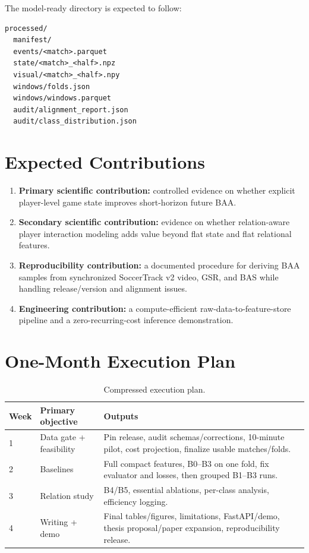 \documentclass[11pt,a4paper]{article}
\begin{document}
The model-ready directory is expected to follow:
\begin{verbatim}
processed/
  manifest/
  events/<match>.parquet
  state/<match>_<half>.npz
  visual/<match>_<half>.npy
  windows/folds.json
  windows/windows.parquet
  audit/alignment_report.json
  audit/class_distribution.json
\end{verbatim}

\section{Expected Contributions}
\begin{enumerate}
  \item \textbf{Primary scientific contribution:} controlled evidence on whether explicit player-level game state improves short-horizon future BAA.
  \item \textbf{Secondary scientific contribution:} evidence on whether relation-aware player interaction modeling adds value beyond flat state and flat relational features.
  \item \textbf{Reproducibility contribution:} a documented procedure for deriving BAA samples from synchronized SoccerTrack v2 video, GSR, and BAS while handling release/version and alignment issues.
  \item \textbf{Engineering contribution:} a compute-efficient raw-data-to-feature-store pipeline and a zero-recurring-cost inference demonstration.
\end{enumerate}

\section{One-Month Execution Plan}
\begin{table}[H]
\centering
\caption{Compressed execution plan.}
\begin{tabularx}{\textwidth}{p{1.5cm}p{4.0cm}X}
\toprule
\textbf{Week} & \textbf{Primary objective} & \textbf{Outputs} \\
\midrule
1 & Data gate + feasibility & Pin release, audit schemas/corrections, 10-minute pilot, cost projection, finalize usable matches/folds. \\
2 & Baselines & Full compact features, B0--B3 on one fold, fix evaluator and losses, then grouped B1--B3 runs. \\
3 & Relation study & B4/B5, essential ablations, per-class analysis, efficiency logging. \\
4 & Writing + demo & Final tables/figures, limitations, FastAPI/demo, thesis proposal/paper expansion, reproducibility release. \\
\bottomrule
\end{tabularx}
\end{table}
\end{document}

